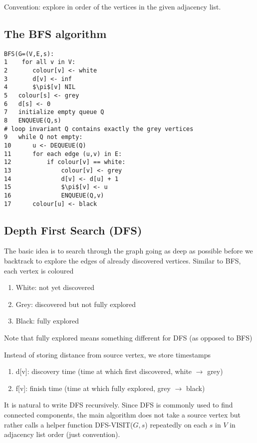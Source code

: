 \documentclass[11pt]{article}
\begin{document}
Convention: explore in order of the vertices in the given adjacency list. 

\subsection{The BFS algorithm}

\begin{lstlisting}
BFS(G=(V,E,s):
1    for all v in V: 
2       colour[v] <- white
3       d[v] <- inf
4       $\pi$[v] NIL 
5   colour[s] <- grey 
6   d[s] <- 0 
7   initialize empty queue Q
8   ENQUEUE(Q,s)        
# loop invariant Q contains exactly the grey vertices 
9   while Q not empty:
10      u <- DEQUEUE(Q)
11      for each edge (u,v) in E: 
12          if colour[v] == white: 
13              colour[v] <- grey 
14              d[v] <- d[u] + 1
15              $\pi$[v] <- u
16              ENQUEUE(Q,v)
17      colour[u] <- black 
\end{lstlisting}


\subsection{Depth First Search (DFS)}
The basic idea is to search through the graph going as deep as possible before we backtrack to explore the edges of already discovered vertices. Similar to BFS, each vertex is coloured 
\begin{enumerate}
    \item White: not yet discovered
    \item Grey: discovered but not fully explored
    \item Black: fully explored
\end{enumerate}
Note that fully explored means something different for DFS (as opposed to BFS)

Instead of storing distance from source vertex, we store timestamps
\begin{enumerate}
    \item d[v]: discovery time (time at which first discovered, white $\rightarrow$ grey) 
    \item f[v]: finish time (time at which fully explored, grey $\rightarrow$ black)
\end{enumerate}
It is natural to write DFS recursively. Since DFS is commonly used to find connected components, the main algorithm does not take a source vertex but rather calls a helper function DFS-VISIT($G,s$) repeatedly on each $s$ in $V$ in adjacency list order (just convention).
\end{document}
